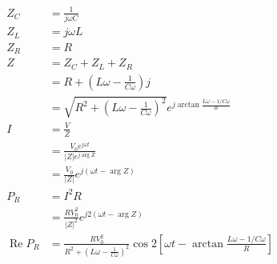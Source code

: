 \documentclass{article}
\renewcommand{\Re}{\operatorname{Re}}
\begin{document}
\subsection{}

\begin{align*}
  Z_C     & = \frac{1}{j \omega C}                                                                                                                            \\
  Z_L     & = j \omega L                                                                                                                                      \\
  Z_R     & = R                                                                                                                                               \\
  Z       & = Z_C + Z_L + Z_R                                                                                                                                 \\
          & = R + \left( L \omega - \frac{1}{C \omega} \right) j                                                                                              \\
          & = \sqrt{R^2 + \left( L \omega - \frac{1}{C \omega} \right)^2} e^{j \arctan \frac{L \omega - 1 / C \omega}{R}}                                     \\
  I       & = \frac{V}{Z}                                                                                                                                     \\
          & = \frac{V_0 e^{j \omega t}}{|Z| e^{j \arg Z}}                                                                                                     \\
          & = \frac{V_0}{|Z|} e^{j (\omega t - \arg Z)}                                                                                                       \\
  P_R     & = I^2 R                                                                                                                                           \\
          & = \frac{R V_0^2}{|Z|^2} e^{j 2 (\omega t - \arg Z)}                                                                                               \\
  \Re P_R & = \frac{R V_0^2}{R^2 + \left( L \omega - \frac{1}{C \omega} \right)^2} \cos 2 \left[ \omega t - \arctan \frac{L \omega - 1 / C \omega}{R} \right]
\end{align*}
\end{document}
